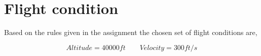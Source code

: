 \section{Flight condition}
Based on the rules given in the assignment the chosen set of flight conditions are,

\begin{equation*}
    Altitude = 40000ft \qquad  Velocity=300ft/s
\end{equation*}
